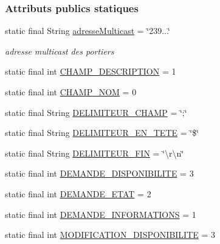 \subsubsection*{Attributs publics statiques}
\begin{DoxyCompactItemize}
\item 
static final String \hyperlink{classcom_1_1lasalle_1_1meeting_1_1_communication_a6a2d2e62f87bef261a1999eb5acf8abb}{adresse\+Multicast} = \char`\"{}239...\char`\"{}
\begin{DoxyCompactList}\small\item\em adresse multicast des portiers \end{DoxyCompactList}\item 
static final int \hyperlink{classcom_1_1lasalle_1_1meeting_1_1_communication_ab1b74caade66cc37a1180d3f10383db8}{C\+H\+A\+M\+P\+\_\+\+D\+E\+S\+C\+R\+I\+P\+T\+I\+ON} = 1
\item 
static final int \hyperlink{classcom_1_1lasalle_1_1meeting_1_1_communication_a8e064e494a3d43ced5aefb524701bc22}{C\+H\+A\+M\+P\+\_\+\+N\+OM} = 0
\item 
static final String \hyperlink{classcom_1_1lasalle_1_1meeting_1_1_communication_aeff38852b1f770d9a13cd5bf02090bb1}{D\+E\+L\+I\+M\+I\+T\+E\+U\+R\+\_\+\+C\+H\+A\+MP} = \char`\"{};\char`\"{}
\item 
static final String \hyperlink{classcom_1_1lasalle_1_1meeting_1_1_communication_a6560c39bb7ebc968e007e4dd98ec296c}{D\+E\+L\+I\+M\+I\+T\+E\+U\+R\+\_\+\+E\+N\+\_\+\+T\+E\+TE} = \char`\"{}\$\char`\"{}
\item 
static final String \hyperlink{classcom_1_1lasalle_1_1meeting_1_1_communication_a6f2e7cb2145496069cdf1b33d017be58}{D\+E\+L\+I\+M\+I\+T\+E\+U\+R\+\_\+\+F\+IN} = \char`\"{}\textbackslash{}r\textbackslash{}n\char`\"{}
\item 
static final int \hyperlink{classcom_1_1lasalle_1_1meeting_1_1_communication_a518dd253a20818a8bbc672ffcd93aeb7}{D\+E\+M\+A\+N\+D\+E\+\_\+\+D\+I\+S\+P\+O\+N\+I\+B\+I\+L\+I\+TE} = 3
\item 
static final int \hyperlink{classcom_1_1lasalle_1_1meeting_1_1_communication_acb13915d9514b99c3b9bc99358e42db6}{D\+E\+M\+A\+N\+D\+E\+\_\+\+E\+T\+AT} = 2
\item 
static final int \hyperlink{classcom_1_1lasalle_1_1meeting_1_1_communication_a9a0b852b1753e97242edaba93f63a4d6}{D\+E\+M\+A\+N\+D\+E\+\_\+\+I\+N\+F\+O\+R\+M\+A\+T\+I\+O\+NS} = 1
\item 
static final int \hyperlink{classcom_1_1lasalle_1_1meeting_1_1_communication_a39defd6718a8774ae75addf9f8f6f3cd}{M\+O\+D\+I\+F\+I\+C\+A\+T\+I\+O\+N\+\_\+\+D\+I\+S\+P\+O\+N\+I\+B\+I\+L\+I\+TE} = 3

\end{DoxyCompactItemize}
